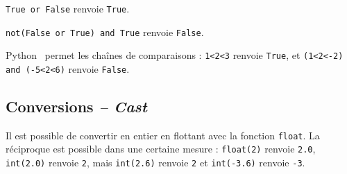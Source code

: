 \begin{exemple}
\texttt{True or False} renvoie \texttt{True}. 

\texttt{not(False or True) and True} renvoie \texttt{False}.
\end{exemple}

\begin{remarque}
Python \ permet les chaînes de comparaisons : \texttt{1<2<3} renvoie
\texttt{True}, et \texttt{(1<2<-2) and (-5<2<6)} renvoie \texttt{False}.
\end{remarque}

\subsection{Conversions \textit{-- Cast}}

Il est possible de convertir en entier en flottant avec la fonction \texttt{float}. La réciproque est possible dans une certaine 
mesure : \texttt{float(2)} renvoie \texttt{2.0}, \texttt{int(2.0)} renvoie \texttt{2}, mais \texttt{int(2.6)} renvoie \texttt{2} et 
\texttt{int(-3.6)} renvoie \texttt{-3}.

